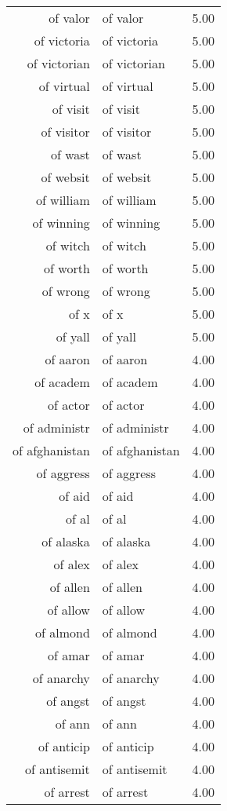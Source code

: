 \begin{table}[ht]
\begin{tabular}{rlr}
  of valor & of valor & 5.00 \\ 
  of victoria & of victoria & 5.00 \\ 
  of victorian & of victorian & 5.00 \\ 
  of virtual & of virtual & 5.00 \\ 
  of visit & of visit & 5.00 \\ 
  of visitor & of visitor & 5.00 \\ 
  of wast & of wast & 5.00 \\ 
  of websit & of websit & 5.00 \\ 
  of william & of william & 5.00 \\ 
  of winning & of winning & 5.00 \\ 
  of witch & of witch & 5.00 \\ 
  of worth & of worth & 5.00 \\ 
  of wrong & of wrong & 5.00 \\ 
  of x & of x & 5.00 \\ 
  of yall & of yall & 5.00 \\ 
  of aaron & of aaron & 4.00 \\ 
  of academ & of academ & 4.00 \\ 
  of actor & of actor & 4.00 \\ 
  of administr & of administr & 4.00 \\ 
  of afghanistan & of afghanistan & 4.00 \\ 
  of aggress & of aggress & 4.00 \\ 
  of aid & of aid & 4.00 \\ 
  of al & of al & 4.00 \\ 
  of alaska & of alaska & 4.00 \\ 
  of alex & of alex & 4.00 \\ 
  of allen & of allen & 4.00 \\ 
  of allow & of allow & 4.00 \\ 
  of almond & of almond & 4.00 \\ 
  of amar & of amar & 4.00 \\ 
  of anarchy & of anarchy & 4.00 \\ 
  of angst & of angst & 4.00 \\ 
  of ann & of ann & 4.00 \\ 
  of anticip & of anticip & 4.00 \\ 
  of antisemit & of antisemit & 4.00 \\ 
  of arrest & of arrest & 4.00 \\ 

\end{tabular}
\end{table}

